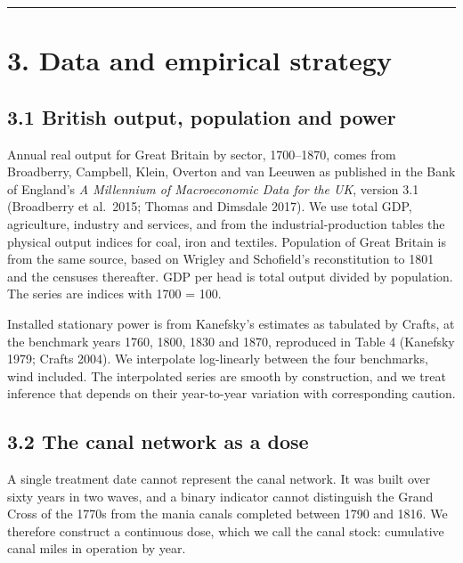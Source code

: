 \documentclass[
  11pt,
]{article}
\begin{document}
\begin{center}\rule{0.5\linewidth}{0.5pt}\end{center}

\section{3. Data and empirical
strategy}\label{data-and-empirical-strategy}

\subsection{3.1 British output, population and
power}\label{british-output-population-and-power}

Annual real output for Great Britain by sector, 1700--1870, comes from
Broadberry, Campbell, Klein, Overton and van Leeuwen as published in the
Bank of England's \emph{A Millennium of Macroeconomic Data for the UK},
version 3.1 (Broadberry et al.~2015; Thomas and Dimsdale 2017). We use
total GDP, agriculture, industry and services, and from the
industrial-production tables the physical output indices for coal, iron
and textiles. Population of Great Britain is from the same source, based
on Wrigley and Schofield's reconstitution to 1801 and the censuses
thereafter. GDP per head is total output divided by population. The
series are indices with 1700 = 100.

Installed stationary power is from Kanefsky's estimates as tabulated by
Crafts, at the benchmark years 1760, 1800, 1830 and 1870, reproduced in
Table 4 (Kanefsky 1979; Crafts 2004). We interpolate log-linearly
between the four benchmarks, wind included. The interpolated series are
smooth by construction, and we treat inference that depends on their
year-to-year variation with corresponding caution.

\subsection{3.2 The canal network as a
dose}\label{the-canal-network-as-a-dose}

A single treatment date cannot represent the canal network. It was built
over sixty years in two waves, and a binary indicator cannot distinguish
the Grand Cross of the 1770s from the mania canals completed between
1790 and 1816. We therefore construct a continuous dose, which we call
the canal stock: cumulative canal miles in operation by year.
\end{document}
